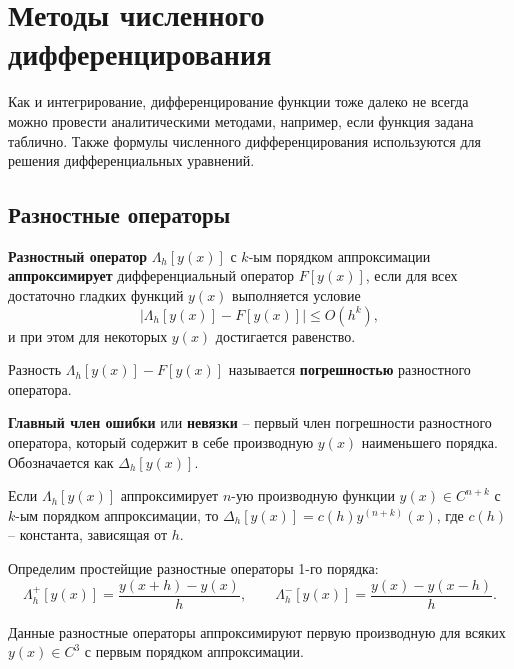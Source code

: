 \documentclass[../main.tex]{subfile}
\begin{document}
\section{Методы численного дифференцирования}
Как и интегрирование, дифференцирование функции тоже далеко не всегда можно
провести аналитическими методами, например, если функция задана таблично. Также
формулы численного дифференцирования используются для решения дифференциальных
уравнений.

\subsection{Разностные операторы}
\begin{define}\label{eq:difference_operator}
	\textbf{Разностный оператор} $\Lambda_h[y(x)]$ с $k$-ым порядком
	аппроксимации \textbf{аппроксимирует} дифференциальный оператор
	$F[y(x)]$, если для всех достаточно гладких функций $y(x)$ выполняется
	условие
	\[\big|\Lambda_h[y(x)]-F[y(x)]\big|\le O(h^k),\]
	и при этом для некоторых $y(x)$ достигается равенство.
\end{define}

\begin{define}
	Разность $\Lambda_h[y(x)]-F[y(x)]$ называется \textbf{погрешностью}
	разностного оператора.
\end{define}

\begin{define}
	\textbf{Главный член ошибки} или \textbf{невязки} -- первый член
	погрешности разностного оператора, который содержит в себе производную
	$y(x)$ наименьшего порядка. Обозначается как $\Delta_h[y(x)]$.

	Если $\Lambda_h[y(x)]$ аппроксимирует $n$-ую производную функции
	$y(x)\in C^{n+k}$ с $k$-ым порядком аппроксимации, то $\Delta_h[y(x)]=
	c(h)y^{(n+k)}(x)$, где $c(h)$ -- константа, зависящая от $h$.
\end{define}

\begin{define} \label{eq:simpliest_difference_operators}
	Определим простейщие разностные операторы 1-го порядка:
	\[\Lambda_h^+[y(x)]=\frac{y(x+h)-y(x)}{h},\qquad
	\Lambda_h^-[y(x)]=\frac{y(x)-y(x-h)}{h}.\]
\end{define}

\begin{lemma}
	Данные разностные операторы аппроксимируют первую производную для всяких
	$y(x)\in C^3$ с первым порядком аппроксимации.
\end{lemma}
\end{document}
